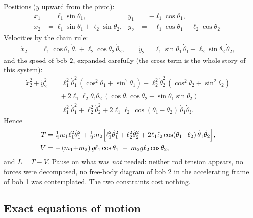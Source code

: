 \documentclass[11pt]{article}
\theoremstyle{plain}
\theoremstyle{definition}
\theoremstyle{remark}
\begin{document}
Positions ($y$ upward from the pivot):
\begin{align}
  x_1 &= \ell_1\sin\theta_1, & y_1 &= -\ell_1\cos\theta_1, \\
  x_2 &= \ell_1\sin\theta_1 + \ell_2\sin\theta_2, &
  y_2 &= -\ell_1\cos\theta_1 - \ell_2\cos\theta_2 .
\end{align}
Velocities by the chain rule:
\begin{align}
  \dot x_2 &= \ell_1\cos\theta_1\,\dot\theta_1 + \ell_2\cos\theta_2\,\dot\theta_2,
  \qquad
  \dot y_2 = \ell_1\sin\theta_1\,\dot\theta_1 + \ell_2\sin\theta_2\,\dot\theta_2 ,
\end{align}
and the speed of bob 2, expanded carefully (the cross term is the whole
story of this system):
\begin{align}
  \dot x_2^2 + \dot y_2^2
  &= \ell_1^2\dot\theta_1^2\,(\cos^2\theta_1 + \sin^2\theta_1)
   + \ell_2^2\dot\theta_2^2\,(\cos^2\theta_2 + \sin^2\theta_2) \nonumber\\
  &\quad + 2\ell_1\ell_2\dot\theta_1\dot\theta_2\,
    (\cos\theta_1\cos\theta_2 + \sin\theta_1\sin\theta_2) \nonumber\\
  &= \ell_1^2\dot\theta_1^2 + \ell_2^2\dot\theta_2^2
   + 2\ell_1\ell_2\,\cos(\theta_1 - \theta_2)\,\dot\theta_1\dot\theta_2 .
\end{align}
Hence
\begin{align}
  T &= \tfrac12 m_1\ell_1^2\dot\theta_1^2
     + \tfrac12 m_2\Bigl[\ell_1^2\dot\theta_1^2 + \ell_2^2\dot\theta_2^2
     + 2\ell_1\ell_2\cos(\theta_1{-}\theta_2)\,\dot\theta_1\dot\theta_2\Bigr], \\
  V &= -\,(m_1{+}m_2)\,g\ell_1\cos\theta_1 \;-\; m_2 g\ell_2\cos\theta_2 ,
\end{align}
and $L = T - V$. Pause on what was \emph{not} needed: neither rod tension
appears, no forces were decomposed, no free-body diagram of bob 2 in the
accelerating frame of bob 1 was contemplated. The two constraints cost
nothing.

\subsection{Exact equations of motion}
\end{document}
